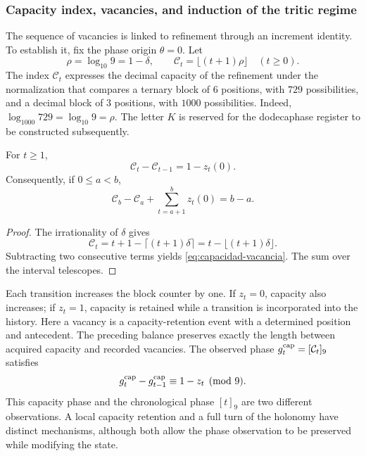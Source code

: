 \subsubsection{Capacity index, vacancies, and induction of the tritic regime}
\label{vac-capacidad-trit}

The sequence of vacancies is linked to refinement through an
increment identity. To establish it, fix the phase origin
\(\theta=0\). Let
\[
 \rho=\log_{10}9=1-\delta,\qquad
 \mathcal C_t=\lfloor(t+1)\rho\rfloor\quad(t\geq0).
\]
The index \(\mathcal C_t\) expresses the decimal capacity of the refinement
under the normalization that compares a ternary block of \(6\) positions,
with \(729\) possibilities, and a decimal block of \(3\) positions, with
\(1000\) possibilities. Indeed,
\(\log_{1000}729=\log_{10}9=\rho\). The letter \(K\) is reserved for
the dodecaphase register to be constructed subsequently.

\begin{proposition}
\label{prop:capacidad-vacancia}
For \(t\geq1\),
\begin{equation}
 \mathcal C_t-\mathcal C_{t-1}=1-z_t(0).
 \label{eq:capacidad-vacancia}
\end{equation}
Consequently, if \(0\leq a<b\),
\[
 \mathcal C_b-\mathcal C_a+
 \sum_{t=a+1}^{b}z_t(0)=b-a.
\]
\end{proposition}
\begin{proof}
The irrationality of \(\delta\) gives
\[
 \mathcal C_t
 =t+1-\lceil(t+1)\delta\rceil
 =t-\lfloor(t+1)\delta\rfloor.
\]
Subtracting two consecutive terms yields
\eqref{eq:capacidad-vacancia}. The sum over the interval telescopes.
\end{proof}

Each transition increases the block counter by one. If
\(z_t=0\), capacity also increases; if \(z_t=1\), capacity is
retained while a transition is incorporated into the history. Here a vacancy
is a capacity-retention event with a determined position and
antecedent. The preceding balance preserves exactly the
length between acquired capacity and recorded vacancies. The observed phase
\(g_t^{\rm cap}=[\mathcal C_t]_9\) satisfies
\[
 g_t^{\rm cap}-g_{t-1}^{\rm cap}\equiv1-z_t\pmod9.
\]
This capacity phase and the chronological phase \([t]_9\) are two
different observations. A local capacity retention and a full turn
of the holonomy have distinct mechanisms, although both
allow the phase observation to be preserved while modifying the state.

